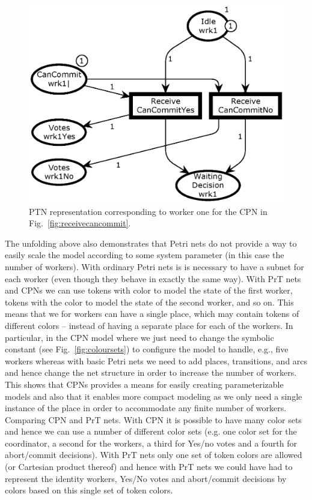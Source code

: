 \begin{figure}[t]
\centering
\includegraphics[scale=.45]{figures/PTReceiveCanCommit.eps}
\caption{PTN representation corresponding to worker one for the CPN in Fig.~\ref{fig:receivecancommit}.}
\label{fig:receivecancommitunfold}
\end{figure}


The unfolding above also demonstrates that Petri nets do not provide a
way to easily scale the model according to some system parameter (in
this case the number of workers). With ordinary Petri nets is is
necessary to have a subnet for each worker (even though they behave in
exactly the same way). With PrT nets and CPNs we can use tokens with
color  to model the state of the first worker, tokens
with the color  to model the state of the second
worker, and so on. This means that we for  workers can have
a single  place, which may contain tokens of 
different colors -- instead of having a separate  place
for each of the  workers. In particular, in the CPN model
where we just need to change the symbolic constant  (see
Fig.~\ref{fig:coloursets}) to configure the model to handle, e.g.,
five workers whereas with basic Petri nets we need to add places,
transitions, and arcs and hence change the net structure in order to
increase the number of workers.  This shows that CPNs provides a means
for easily creating parameterizable models and also that it enables
more compact modeling as we only need a single instance of the
 place in order to accommodate any finite number of
workers. Comparing CPN and PrT nets. With CPN it is possible to have
many color sets and hence we can use a number of different color sets
(e.g. one color set for the coordinator, a second for the workers, a
third for Yes/no votes and a fourth for abort/commit decisions). With
PrT nets only one set of token colors are allowed (or Cartesian
product thereof) and hence with PrT nets we could have had to
represent the identity workers, Yes/No votes and abort/commit
decisions by colors based on this single set of token colors.
